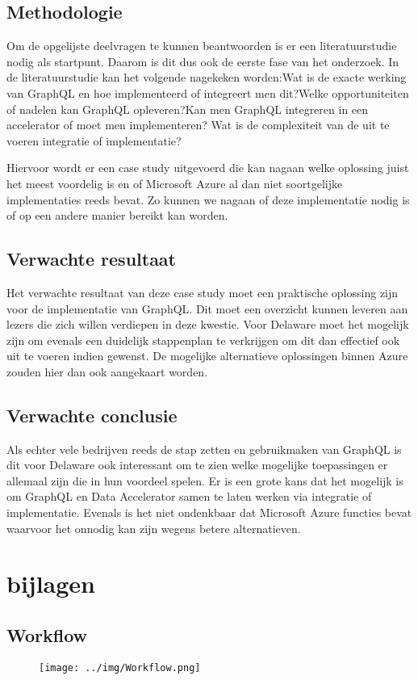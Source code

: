 \section{Methodologie}%
\label{sec:methodologie}

Om de opgelijste deelvragen te kunnen beantwoorden is er een literatuurstudie nodig als startpunt. Daarom is dit dus ook de eerste fase van het onderzoek. In de literatuurstudie kan het volgende nagekeken worden:\newline Wat is de exacte werking van GraphQL en hoe implementeerd of integreert men dit?\newline Welke opportuniteiten of nadelen kan GraphQL opleveren?\newline Kan men GraphQL integreren in een accelerator of moet men implementeren? \newline Wat is de complexiteit van de uit te voeren integratie of implementatie?

Hiervoor wordt er een case study uitgevoerd die kan nagaan welke oplossing juist het meest voordelig is en of Microsoft Azure al dan niet soortgelijke implementaties reeds bevat. Zo kunnen we nagaan of deze implementatie nodig is of op een andere manier bereikt kan worden.

\section{Verwachte resultaat}
\label{sec:verwachte resultaat}
Het verwachte resultaat van deze case study moet een praktische oplossing zijn voor de implementatie van GraphQL. Dit moet een overzicht kunnen leveren aan lezers die zich willen verdiepen in deze kwestie. Voor Delaware moet het mogelijk zijn om evenals een duidelijk stappenplan te verkrijgen om dit dan effectief ook uit te voeren indien gewenst. De mogelijke alternatieve oplossingen binnen Azure zouden hier dan ook aangekaart worden.

\section{Verwachte conclusie}
\label{sec:verwachte conclusiet}
Als echter vele bedrijven reeds de stap zetten en gebruikmaken van GraphQL is dit voor Delaware ook interessant om te zien welke mogelijke toepassingen er allemaal zijn die in hun voordeel spelen. Er is een grote kans dat het mogelijk is om GraphQL en Data Accelerator samen te laten werken via integratie of implementatie. Evenals is het niet ondenkbaar dat Microsoft Azure functies bevat waarvoor het onnodig kan zijn wegens betere alternatieven.


\chapter{bijlagen}

\section{Workflow}%
\label{sec:Workflow}

\begin{figure}
    \texttt{[image: ../img/Workflow.png]}
\end{figure}

